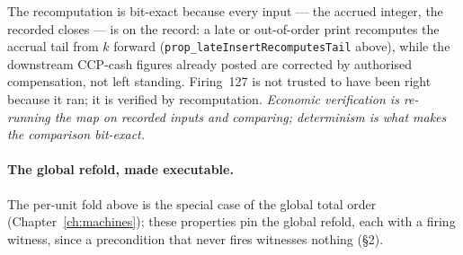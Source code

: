 \documentclass[11pt,a4paper]{article}
\begin{document}
The recomputation is bit-exact because every input --- the accrued integer, the recorded
closes --- is on the record: a late or out-of-order print recomputes the accrual tail from
$k$ forward (\texttt{prop\_lateInsertRecomputesTail} above), while the downstream CCP-cash
figures already posted are corrected by authorised compensation, not left standing. Firing~127
is not trusted to have been right because it ran; it is verified by recomputation.
\emph{Economic verification is re-running the map on recorded inputs and comparing;
determinism is what makes the comparison bit-exact.}

\paragraph{The global refold, made executable.} The per-unit fold above is the special case
of the global total order (Chapter~\ref{ch:machines}); these properties pin the global refold,
each with a firing witness, since a precondition that never fires witnesses nothing (\S2).
\end{document}
